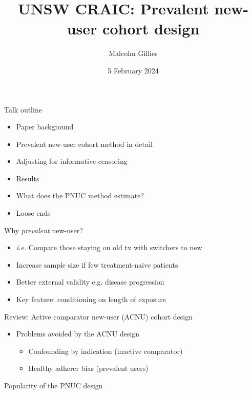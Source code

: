 \documentclass[aspectratio=169,12pt]{beamer} %
\title{UNSW CRAIC: Prevalent new-user cohort design}
\author{Malcolm Gillies}
\institute{\url{https://github.com/mbg-unsw/pnuc}}
\date{5 February 2024}
\begin{document}
{
\begin{frame}
\titlepage
\end{frame}
}

\begin{frame}{Talk outline}
    \begin{itemize}
	\item Paper background
	\item Prevalent new-user cohort method in detail
	\item Adjusting for informative censoring
	\item Results
	\item What does the PNUC method estimate?
	\item Loose ends
    \end{itemize}
\end{frame}

\begin{frame}{Why \emph{prevalent} new-user?}
    \begin{itemize}
	\item \emph{i.e.} Compare those staying on old tx with switchers to new
	\item Increase sample size if few treatment-naive patients
	\item Better external validity e.g. disease progression
	\item Key feature: conditioning on length of exposure
    \end{itemize}
\end{frame}

\begin{frame}{Review: Active comparator new-user (ACNU) cohort design}
    \begin{itemize}
	\item Problems avoided by the ACNU design
	\begin{itemize}
		\item Confounding by indication (inactive comparator)
		\item Healthy adherer bias (prevalent users)
	\end{itemize}
    \end{itemize}
\end{frame}

\begin{frame}{Popularity of the PNUC design}
\end{frame}
\end{document}
